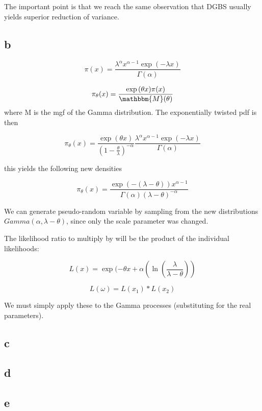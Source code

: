 \documentclass[12pt]{report}
\begin{document}
The important point is that we reach the same observation that DGBS usually yields superior reduction of variance.


\subsection*{b}

$$
\pi(x) = \dfrac{\lambda^\alpha x^{\alpha -1} \exp{(- \lambda x)}}{\Gamma(\alpha)}
$$

$$
\pi_{\theta}(x) = \dfrac{\exp{(\theta x)} \pi(x)}{\mathbbm{M}(\theta)}
$$
where M is the mgf of the Gamma distribution. The exponentially twisted pdf is then

$$
\pi_{\theta}(x) =
\dfrac{\exp(\theta x)}{(1 - \frac{\theta}{\lambda})^{-\alpha}}
\dfrac{\lambda^\alpha x^{\alpha -1} \exp(- \lambda x)}{\Gamma(\alpha)}
$$

this yields the following new densities

$$
\pi_{\theta}(x) = \dfrac{\exp(- (\lambda - \theta)) x^{\alpha - 1}}{\Gamma(\alpha) (\lambda - \theta)^{-\alpha}}
$$

We can generate pseudo-random variable by sampling from the new distributions $Gamma(\alpha, \lambda - \theta)$, since only the scale parameter was changed. 

\vspace{1 cm}
The likelihood ratio to multiply by will be the product of the individual likelihoods:

$$
L(x) = \exp( -\theta x + \alpha(\ln(\frac{\lambda}{\lambda - \theta}))
$$

$$
	L(\omega) = L(x_1) * L(x_2) 
$$

We must simply apply these to the Gamma processes (substituting for the real parameters).

\subsection*{c}


\subsection*{d}
\subsection*{e}
\end{document}
